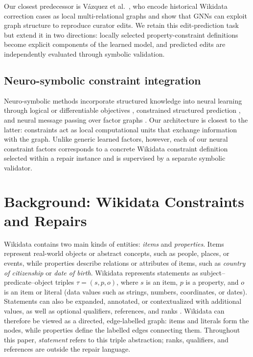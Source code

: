 \documentclass[a4paper,UKenglish,cleveref,autoref,thm-restate]{tgdk-v2021}
\begin{document}
Our closest predecessor is V\'azquez et al.~\cite{vazquez2026structure}, who encode historical Wikidata correction cases as local multi-relational graphs and show that GNNs can exploit graph structure to reproduce curator edits. We retain this edit-prediction task but extend it in two directions: locally selected property-constraint definitions become explicit components of the learned model, and predicted edits are independently evaluated through symbolic validation. %

\subsection{Neuro-symbolic constraint integration}

Neuro-symbolic methods incorporate structured knowledge into neural learning through logical or differentiable objectives \cite{xu2018semantic,fischer2019dl2,yang2022clste}, constrained structured prediction \cite{jiang2022coresp}, and neural message passing over factor graphs \cite{zhang2023fgnn,garciasatorras2021nebp}. Our architecture is closest to the latter: constraints act as local computational units that exchange information with the graph. Unlike generic learned factors, however, each of our neural constraint factors corresponds to a concrete Wikidata constraint definition selected within a repair instance and is supervised by a separate symbolic validator. %

\section{Background: Wikidata Constraints and Repairs}
\label{sec:background}

Wikidata contains two main kinds of entities: \emph{items} and \emph{properties}. Items represent real-world objects or abstract concepts, such as people, places, or events, while properties describe relations or attributes of items, such as \emph{country of citizenship} or \emph{date of birth}. Wikidata represents statements as subject--predicate--object triples \(\tau=(s,p,o)\), where \(s\) is an item, \(p\) is a property, and \(o\) is an item or literal (data values such as strings, numbers, coordinates, or dates). Statements can also be expanded, annotated, or contextualized with additional values, as well as optional qualifiers, references, and ranks \cite{wikidataDataModel,vrandecic2014wikidata}. Wikidata can therefore be viewed as a directed, edge-labelled graph: items and literals form the nodes, while properties define the labelled edges connecting them. Throughout this paper, \emph{statement} refers to this triple abstraction; ranks, qualifiers, and references are outside the repair language.
\end{document}
